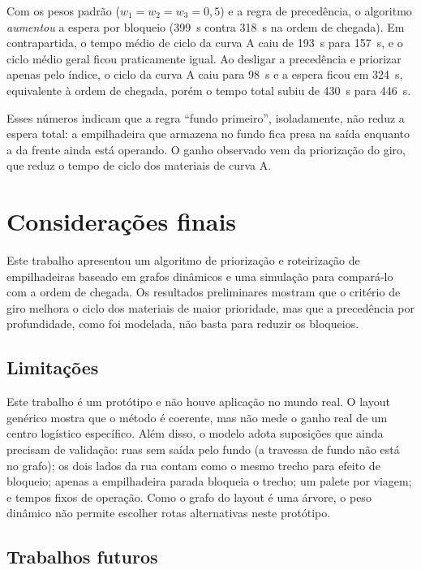 \documentclass[
	article,
	11pt,
	oneside,
	a4paper,
	english,
	brazil,
	sumario=tradicional
	]{abntex2}
\begin{document}
Com os pesos padrão ($w_1 = w_2 = w_3 = 0{,}5$) e a regra de precedência, o
algoritmo \emph{aumentou} a espera por bloqueio (399~s contra 318~s na ordem de
chegada). Em contrapartida, o tempo médio de ciclo da curva A caiu de 193~s para
157~s, e o ciclo médio geral ficou praticamente igual. Ao desligar a
precedência e priorizar apenas pelo índice, o ciclo da curva A caiu para 98~s e
a espera ficou em 324~s, equivalente à ordem de chegada, porém o tempo total
subiu de 430~s para 446~s.

Esses números indicam que a regra ``fundo primeiro'', isoladamente, não reduz a
espera total: a empilhadeira que armazena no fundo fica presa na saída enquanto
a da frente ainda está operando. O ganho observado vem da priorização do giro,
que reduz o tempo de ciclo dos materiais de curva A.

\section{Considerações finais}
\label{sec:consideracoes}

Este trabalho apresentou um algoritmo de priorização e roteirização de
empilhadeiras baseado em grafos dinâmicos e uma simulação para compará-lo com a
ordem de chegada. Os resultados preliminares
mostram que o critério de giro melhora o ciclo dos materiais de maior prioridade,
mas que a precedência por profundidade, como foi modelada, não basta para reduzir
os bloqueios.

\subsection{Limitações}

Este trabalho é um protótipo e não houve aplicação no mundo real. O layout
genérico mostra que o método é coerente, mas não mede o ganho real de um
centro logístico específico. Além disso, o modelo adota suposições que ainda
precisam de validação: ruas sem saída pelo fundo (a travessa de fundo não está
no grafo); os dois lados da rua contam como o mesmo trecho para efeito de
bloqueio; apenas a empilhadeira parada bloqueia o trecho; um palete por viagem;
e tempos fixos de operação. Como o grafo do layout é uma árvore, o peso dinâmico
não permite escolher rotas alternativas neste protótipo.

\subsection{Trabalhos futuros}
\end{document}
